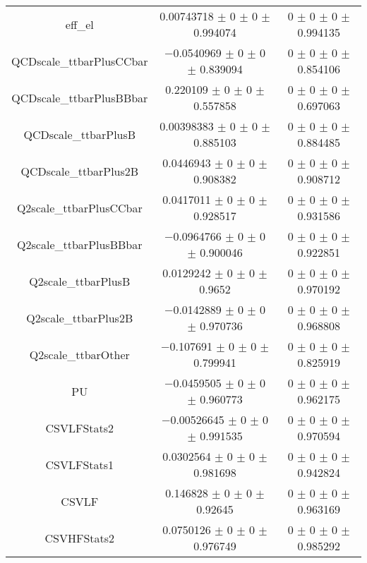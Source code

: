 \begin{table}
\begin{tabular}{ccc}
eff\_el & \num{0.00743718} $\pm$ \num{0} $\pm$ \num{0} $\pm$ \num{0.994074} & \num{0} $\pm$ \num{0} $\pm$ \num{0} $\pm$ \num{0.994135}\\
QCDscale\_ttbarPlusCCbar & \num{-0.0540969} $\pm$ \num{0} $\pm$ \num{0} $\pm$ \num{0.839094} & \num{0} $\pm$ \num{0} $\pm$ \num{0} $\pm$ \num{0.854106}\\
QCDscale\_ttbarPlusBBbar & \num{0.220109} $\pm$ \num{0} $\pm$ \num{0} $\pm$ \num{0.557858} & \num{0} $\pm$ \num{0} $\pm$ \num{0} $\pm$ \num{0.697063}\\
QCDscale\_ttbarPlusB & \num{0.00398383} $\pm$ \num{0} $\pm$ \num{0} $\pm$ \num{0.885103} & \num{0} $\pm$ \num{0} $\pm$ \num{0} $\pm$ \num{0.884485}\\
QCDscale\_ttbarPlus2B & \num{0.0446943} $\pm$ \num{0} $\pm$ \num{0} $\pm$ \num{0.908382} & \num{0} $\pm$ \num{0} $\pm$ \num{0} $\pm$ \num{0.908712}\\
Q2scale\_ttbarPlusCCbar & \num{0.0417011} $\pm$ \num{0} $\pm$ \num{0} $\pm$ \num{0.928517} & \num{0} $\pm$ \num{0} $\pm$ \num{0} $\pm$ \num{0.931586}\\
Q2scale\_ttbarPlusBBbar & \num{-0.0964766} $\pm$ \num{0} $\pm$ \num{0} $\pm$ \num{0.900046} & \num{0} $\pm$ \num{0} $\pm$ \num{0} $\pm$ \num{0.922851}\\
Q2scale\_ttbarPlusB & \num{0.0129242} $\pm$ \num{0} $\pm$ \num{0} $\pm$ \num{0.9652} & \num{0} $\pm$ \num{0} $\pm$ \num{0} $\pm$ \num{0.970192}\\
Q2scale\_ttbarPlus2B & \num{-0.0142889} $\pm$ \num{0} $\pm$ \num{0} $\pm$ \num{0.970736} & \num{0} $\pm$ \num{0} $\pm$ \num{0} $\pm$ \num{0.968808}\\
Q2scale\_ttbarOther & \num{-0.107691} $\pm$ \num{0} $\pm$ \num{0} $\pm$ \num{0.799941} & \num{0} $\pm$ \num{0} $\pm$ \num{0} $\pm$ \num{0.825919}\\
PU & \num{-0.0459505} $\pm$ \num{0} $\pm$ \num{0} $\pm$ \num{0.960773} & \num{0} $\pm$ \num{0} $\pm$ \num{0} $\pm$ \num{0.962175}\\
CSVLFStats2 & \num{-0.00526645} $\pm$ \num{0} $\pm$ \num{0} $\pm$ \num{0.991535} & \num{0} $\pm$ \num{0} $\pm$ \num{0} $\pm$ \num{0.970594}\\
CSVLFStats1 & \num{0.0302564} $\pm$ \num{0} $\pm$ \num{0} $\pm$ \num{0.981698} & \num{0} $\pm$ \num{0} $\pm$ \num{0} $\pm$ \num{0.942824}\\
CSVLF & \num{0.146828} $\pm$ \num{0} $\pm$ \num{0} $\pm$ \num{0.92645} & \num{0} $\pm$ \num{0} $\pm$ \num{0} $\pm$ \num{0.963169}\\
CSVHFStats2 & \num{0.0750126} $\pm$ \num{0} $\pm$ \num{0} $\pm$ \num{0.976749} & \num{0} $\pm$ \num{0} $\pm$ \num{0} $\pm$ \num{0.985292}\\

\end{tabular}
\end{table}
